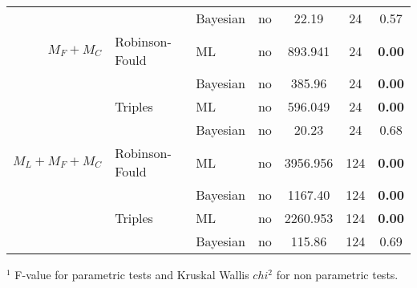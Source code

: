 \begin{tabular}{rllcccc}
                  &                & Bayesian & no & 22.19    & 24  & 0.57          \\
    $M_F+M_C$     & Robinson-Fould & ML       & no & 893.941  & 24  & \textbf{0.00} \\ 
                  &                & Bayesian & no & 385.96   & 24  & \textbf{0.00} \\
                  & Triples        & ML       & no & 596.049  & 24  & \textbf{0.00} \\
                  &                & Bayesian & no & 20.23    & 24  & 0.68          \\ 
    $M_L+M_F+M_C$ & Robinson-Fould & ML       & no & 3956.956 & 124 & \textbf{0.00} \\
                  &                & Bayesian & no & 1167.40  & 124 & \textbf{0.00} \\
                  & Triples        & ML       & no & 2260.953 & 124 & \textbf{0.00} \\
                  &                & Bayesian & no & 115.86   & 124 & 0.69          \\
    \hline
\end{tabular}

$^1$ F-value for parametric tests and Kruskal Wallis $chi^2$ for non parametric tests.